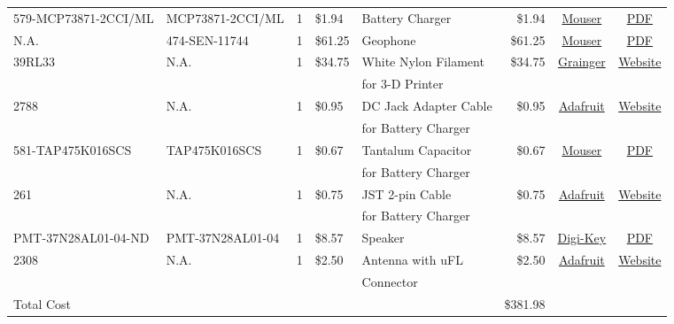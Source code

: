 \documentclass[12pt,landscape]{article}
\begin{document}
\begin{table}[H]
{\begin{tabular}{l|l|c|l|l|r|c|c}
    	579-MCP73871-2CCI/ML & MCP73871-2CCI/ML & 1 & \$1.94 & Battery Charger & \$1.94 & \href{http://www.mouser.com/ProductDetail/Microchip-Technology/MCP73871-2CCI-ML/?qs=qXsUupcbpXyQfJ2clznZxw\%3D\%3D}{Mouser} & \href{http://www.mouser.com/ds/2/268/22090a-52174.pdf}{PDF} \\
		N.A. & 474-SEN-11744 & 1 & \$61.25 & Geophone & \$61.25 & \href{http://www.mouser.com/ProductDetail/SparkFun-Electronics/SEN-11744/?qs=\%2fha2pyFaduhLW6YoPw5UUIdTRP1X\%252btPruyfOHvl8\%2fY0\%3d}{Mouser} & \href{http://cdn.sparkfun.com/datasheets/Sensors/Accelerometers/SM-24\%20Brochure.pdf}{PDF} \\
    	 39RL33 & N.A. & 1 & \$34.75 & White Nylon Filament & \$34.75 & \href{https://www.grainger.com/product/FILABOT-White-Filament-39RL33}{Grainger} & \href{https://www.grainger.com/product/FILABOT-White-Filament-39RL33}{Website} \\
    	 & & & & for 3-D Printer & & \\
    	 2788 & N.A. & 1 & \$0.95 & DC Jack Adapter Cable & \$0.95 & \href{https://www.adafruit.com/products/2788}{Adafruit} & \href{https://www.adafruit.com/products/2788}{Website} \\
    	 & & & & for Battery Charger & & & \\
    	 581-TAP475K016SCS & TAP475K016SCS & 1 & \$0.67 & Tantalum Capacitor & \$0.67 & \href{http://www.mouser.com/ProductDetail/AVX/TAP475K016SCS/?qs=sGAEpiMZZMtZ1n0r9vR22d\%252b8XmbM9QM8L4TTXY3LGQ8\%3d}{Mouser} & \href{http://www.mouser.com/ds/2/40/tap-776819.pdf}{PDF} \\
    	 & & & & for Battery Charger & & & \\
    	 261 & N.A. & 1 & \$0.75 & JST 2-pin Cable & \$0.75 & \href{https://www.adafruit.com/product/261}{Adafruit} & \href{https://www.adafruit.com/product/261}{Website} \\
    	 & & & & for Battery Charger & & & \\
    	 	PMT-37N28AL01-04-ND & PMT-37N28AL01-04 & 1 & \$8.57 & Speaker & \$8.57 & \href{http://www.digikey.com/product-detail/en/peerless-by-tymphany/PMT-37N28AL01-04/PMT-37N28AL01-04-ND/6211115}{Digi-Key} & \href{http://www.tymphany.com/wp-content/themes/pathfinders/cache/pdfs/PMT-37N28AL01-04.pdf}{PDF} \\
        2308 & N.A. & 1 & \$2.50 & Antenna with uFL & \$2.50 & \href{https://www.adafruit.com/products/2308}{Adafruit} & \href{https://www.adafruit.com/products/2308}{Website} \\
    	 & & & & Connector & & & \\ \hline
    	Total Cost & & & & & \$381.98 &
	\end{tabular}%
	}
    \label{tab:bom}
\end{table}
\end{document}
